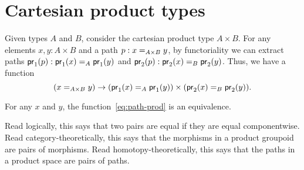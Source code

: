 \section{Cartesian product types}
\label{sec:compute-cartprod}

Given types $A$ and $B$, consider the cartesian product type $A \times B$.  
For any elements $x,y:A\times B$ and a path $p:\id[A\times B]{x}{y}$, by functoriality we can extract paths $\ap{\proj1}p:\id[A]{\proj1(x)}{\proj1(y)}$ and $\ap{\proj2}p:\id[B]{\proj2(x)}{\proj2(y)}$.
Thus, we have a function
\begin{equation}\label{eq:path-prod}
  (\id[A\times B]{x}{y}) \to (\id[A]{\proj1(x)}{\proj1(y)}) \times (\id[B]{\proj2(x)}{\proj2(y)}).
\end{equation}

\begin{thm}\label{thm:path-prod}
  For any $x$ and $y$, the function~\eqref{eq:path-prod} is an equivalence.
\end{thm}

Read logically, this says that two pairs are equal if they are equal
componentwise.  Read category-theoretically, this says that the
morphisms in a product groupoid are pairs of morphisms.  Read
homotopy-theoretically, this says that the paths in a product
space are pairs of paths.

